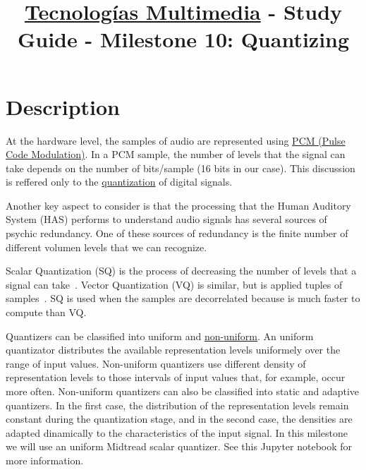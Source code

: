 \title{\href{https://www.ual.es/estudios/grados/presentacion/plandeestudios/asignatura/4015/40154321?idioma=zh_CN}{Tecnologías Multimedia} - Study Guide - Milestone 10: Quantizing}

\maketitle

\section{Description}

At the hardware level, the samples of audio are represented using \href{https://en.wikipedia.org/wiki/Pulse-code_modulation}{PCM
(Pulse Code Modulation)}. In a PCM sample, the number of levels that
the signal can take depends on the number of bits/sample (16 bits in
our case). This discussion is reffered only to the \href{https://en.wikipedia.org/wiki/Quantization_(signal_processing)}{quantization} of
digital signals.

Another key aspect to consider is that the processing that the Human
Auditory System (HAS) performs to understand audio signals has several
sources of psychic redundancy. One of these sources of redundancy is
the finite number of different volumen levels that we can recognize.

Scalar Quantization (SQ) is the process of decreasing the number of
levels that a signal can take~\cite{sayood}.  Vector Quantization (VQ)
is similar, but is applied tuples of
samples~\cite{foundationsofsignalprocessing}. SQ is used when the
samples are decorrelated because is much faster to compute than VQ.

Quantizers can be classified into uniform
and \href{https://nptel.ac.in/content/storage2/courses/117104069/chapter_5/5_5.html}{non-uniform}. An
uniform quantizator distributes the available representation levels
uniformely over the range of input values. Non-uniform quantizers use
different density of representation levels to those intervals of input
values that, for example, occur more often. Non-uniform quantizers can
also be classified into static and adaptive quantizers. In the first
case, the distribution of the representation levels remain constant
during the quantization stage, and in the second case, the densities
are adapted dinamically to the characteristics of the input signal. In
this milestone we will use an uniform Midtread scalar quantizer. See
this Jupyter notebook for more information.


